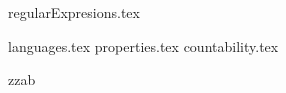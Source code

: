 \documentclass{exam}
\begin{document}

    {regularExpresions.tex}

     {languages.tex}
     {properties.tex}
     {countability.tex}

\begin{questions}

        \printanswers






      \question  zzab




\end{questions}
\end{document}
